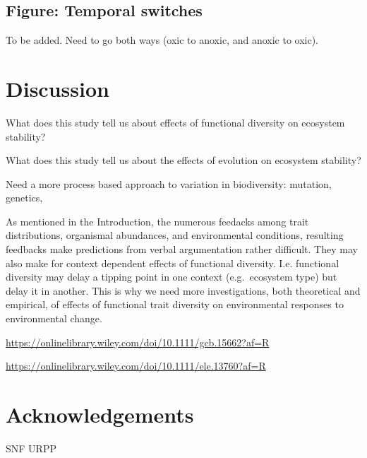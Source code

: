 \documentclass{article}
\begin{document}
\hypertarget{figure-temporal-switches}{%
\subsection{Figure: Temporal switches}\label{figure-temporal-switches}}

To be added. Need to go both ways (oxic to anoxic, and anoxic to oxic).

\hypertarget{discussion}{%
\section{Discussion}\label{discussion}}

What does this study tell us about effects of functional diversity on
ecosystem stability?

What does this study tell us about the effects of evolution on ecosystem
stability?

Need a more process based approach to variation in biodiversity:
mutation, genetics,

As mentioned in the Introduction, the numerous feedacks among trait
distributions, organismal abundances, and environmental conditions,
resulting feedbacks make predictions from verbal argumentation rather
difficult. They may also make for context dependent effects of
functional diversity. I.e. functional diversity may delay a tipping
point in one context (e.g.~ecosystem type) but delay it in another. This
is why we need more investigations, both theoretical and empirical, of
effects of functional trait diversity on environmental responses to
environmental change.

\url{https://onlinelibrary.wiley.com/doi/10.1111/gcb.15662?af=R}

\url{https://onlinelibrary.wiley.com/doi/10.1111/ele.13760?af=R}

\hypertarget{acknowledgements}{%
\section{Acknowledgements}\label{acknowledgements}}

SNF URPP
\end{document}
